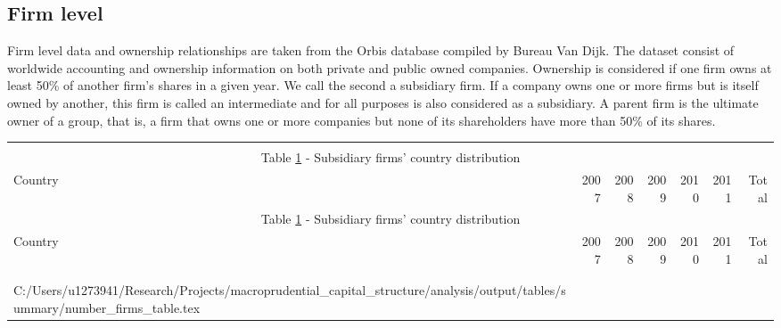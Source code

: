 \documentclass[12pt]{article}
\makeatletter
\newcommand\primitiveinput[1]
{\@@input #1 }
\makeatother
\begin{document}
	  	
 	\subsection{Firm level} \label{subsec:firm}
	Firm level data and ownership relationships are taken from the Orbis database compiled by Bureau Van Dijk. The dataset consist of worldwide accounting and ownership information on both private and public owned companies. Ownership is considered if one firm owns at least 50\% of another firm's shares in a given year. We call the second a subsidiary firm. If a company owns one or more firms but is itself owned by another, this firm is called an intermediate and for all purposes is also considered as a subsidiary. A parent firm is the ultimate owner of a group, that is, a firm that owns one or more companies but none of its shareholders have more than 50\% of its shares.
	
	\begin{small}
		{
			\begin{longtable}{lrrrrrr}\\
				\label{tab:number of firms}\\
				\multicolumn{7}{c}{Table \ref{tab:number of firms} - Subsidiary firms' country distribution}\\
				\hline \hline \addlinespace Country & 2007 & 2008 & 2009 & 2010 & 2011 & Total  \\
				\endfirsthead
				\multicolumn{7}{c}{Table \ref{tab:number of firms} - Subsidiary firms' country distribution}\\
				\hline \hline \addlinespace Country & 2007 & 2008 & 2009 & 2010 & 2011 & Total  \\
				\hline \addlinespace \endhead
				\hline
				\multicolumn{7}{r}{{\textit{(Continued)}}}\\ \endfoot
				\\ 	
				\endlastfoot
				\primitiveinput{C:/Users/u1273941/Research/Projects/macroprudential_capital_structure/analysis/output/tables/summary/number_firms_table.tex}
				\hline 			
			\end{longtable}	
		}
	\end{small}
	
\end{document}
